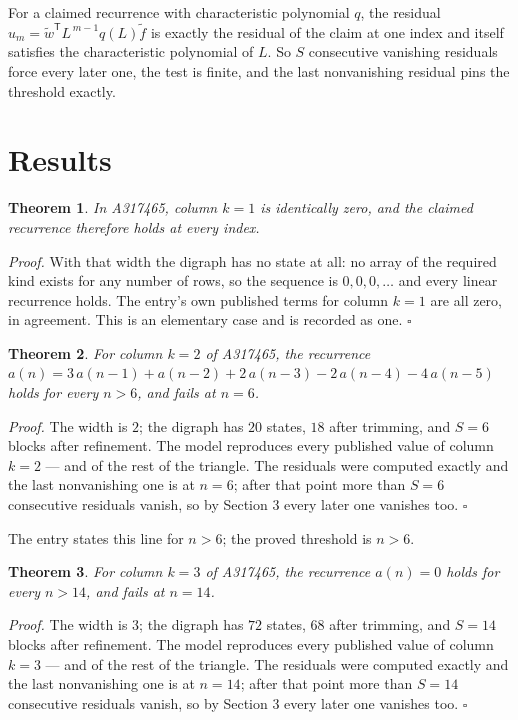 \documentclass[11pt]{article}
\newtheorem{theorem}{Theorem}
\theoremstyle{definition}
\begin{document}
For a claimed recurrence with characteristic polynomial $q$, the residual $u_m = \tilde w^{\mathsf T}L^{\,m-1}q(L)\tilde f$ is exactly the residual of the claim at one index and itself satisfies the characteristic polynomial of $L$. So $S$ consecutive vanishing residuals force every later one, the test is finite, and the last nonvanishing residual pins the threshold exactly.

\section{Results}

\begin{theorem} In A317465, column $k = 1$ is identically zero, and the claimed recurrence therefore holds at every index.\end{theorem}

{\itshape Proof.} With that width the digraph has no state at all: no array of the required kind exists for any number of rows, so the sequence is $0,0,0,\dots$ and every linear recurrence holds. The entry's own published terms for column $k = 1$ are all zero, in agreement. This is an elementary case and is recorded as one. $\square$

\begin{theorem} For column $k = 2$ of A317465, the recurrence $a(n) = 3\,a(n-1) + a(n-2) + 2\,a(n-3) - 2\,a(n-4) - 4\,a(n-5)$ holds for every $n > 6$, and fails at $n = 6$.\end{theorem}

{\itshape Proof.} The width is $2$; the digraph has $20$ states, $18$ after trimming, and $S = 6$ blocks after refinement. The model reproduces every published value of column $k = 2$ --- and of the rest of the triangle. The residuals were computed exactly and the last nonvanishing one is at $n = 6$; after that point more than $S = 6$ consecutive residuals vanish, so by Section 3 every later one vanishes too. $\square$

The entry states this line for $n > 6$; the proved threshold is $n > 6$.

\begin{theorem} For column $k = 3$ of A317465, the recurrence $a(n) = 0$ holds for every $n > 14$, and fails at $n = 14$.\end{theorem}

{\itshape Proof.} The width is $3$; the digraph has $72$ states, $68$ after trimming, and $S = 14$ blocks after refinement. The model reproduces every published value of column $k = 3$ --- and of the rest of the triangle. The residuals were computed exactly and the last nonvanishing one is at $n = 14$; after that point more than $S = 14$ consecutive residuals vanish, so by Section 3 every later one vanishes too. $\square$
\end{document}

